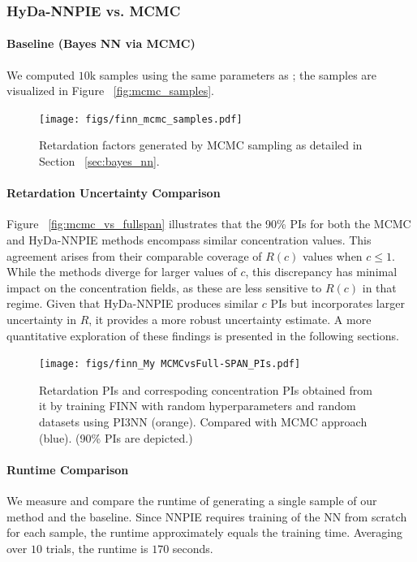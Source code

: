 \subsubsection{HyDa-NNPIE vs. MCMC}

\paragraph{Baseline (Bayes NN via MCMC)}
We computed $10$k samples using the same parameters as \cite{finn}; the samples are visualized in Figure ~\vref{fig:mcmc_samples}.

\begin{figure}[h]
    \centering
    \texttt{[image: figs/finn\_mcmc\_samples.pdf]}
    \caption{Retardation factors generated by MCMC sampling as detailed in Section ~\vref{sec:bayes_nn}.}
    \label{fig:mcmc_samples}
\end{figure}


\paragraph{Retardation Uncertainty Comparison}
Figure ~\vref{fig:mcmc_vs_fullspan} illustrates that the 90\% PIs for both the MCMC and HyDa-NNPIE methods encompass similar concentration values. This agreement arises from their comparable coverage of $R(c)$ values when $c \leq 1$. While the methods diverge for larger values of $c$, this discrepancy has minimal impact on the concentration fields, as these are less sensitive to $R(c)$ in that regime. Given that HyDa-NNPIE produces similar $c$ PIs but incorporates larger uncertainty in $R$, it provides a more robust uncertainty estimate. A more quantitative exploration of these findings is presented in the following sections.

\begin{figure}[h]
    \centering
    \texttt{[image: figs/finn\_My MCMCvsFull-SPAN\_PIs.pdf]}
    \caption{Retardation PIs and correspoding concentration PIs obtained from it by training FINN with random hyperparameters and random datasets using PI3NN (orange). Compared with MCMC approach (blue). (90\% PIs are depicted.)}
    \label{fig:mcmc_vs_fullspan}
\end{figure}




\paragraph{Runtime Comparison}
We measure and compare the runtime of generating a single sample of our method and the baseline. Since NNPIE requires training of the NN from scratch for each sample, the runtime approximately equals the training time. Averaging over $10$ trials, the runtime is $170$ seconds.

